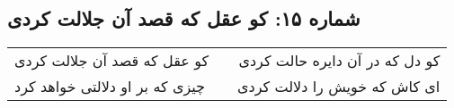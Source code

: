 \begin{center}
\section*{شماره ۱۵: کو عقل که قصد آن جلالت کردی}
\label{sec:015}
\begin{longtable}{l p{0.5cm} r}
کو عقل که قصد آن جلالت کردی
&&
کو دل که در آن دایره حالت کردی
\\
چیزی که بر او دلالتی خواهد کرد
&&
ای کاش که خویش را دلالت کردی
\\
\end{longtable}
\end{center}
